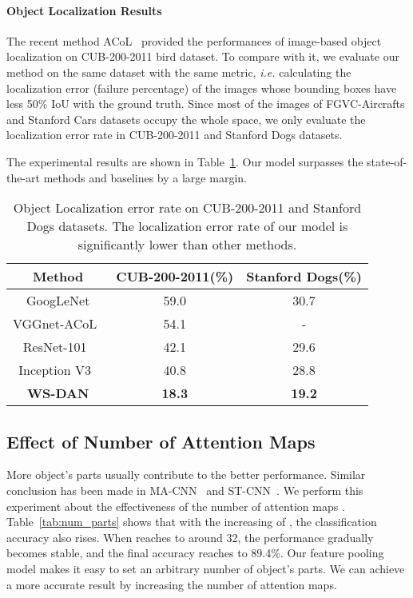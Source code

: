 \documentclass[10pt,twocolumn,letterpaper]{article}
\def\ie{{\em i.e. }}
\begin{document}
\paragraph{Object Localization Results}
 The recent method ACoL~\cite{acol} provided the performances of image-based object localization on CUB-200-2011 bird dataset. To compare with it, we evaluate our method on the same dataset with the same metric, \ie calculating the localization error (failure percentage) of the images whose bounding boxes have less 50\% IoU with the ground truth. Since most of the images of FGVC-Aircrafts and Stanford Cars datasets occupy the whole space, we only evaluate the localization error rate in CUB-200-2011 and Stanford Dogs datasets.

 The experimental results are shown in Table~\ref{tab:localiztion_error}. Our model surpasses the state-of-the-art methods and baselines by a large margin.



\begin{table}[h]
	\begin{center}
		\scriptsize
		\begin{tabular}{c|c|c}
			\hline
			Method & CUB-200-2011(\%) & Stanford Dogs(\%)\\
			\hline
			GoogLeNet  &  59.0 & 30.7 \\
      VGGnet-ACoL~\cite{acol} &  54.1 & - \\
      ResNet-101~\cite{resnet} & 42.1 & 29.6 \\
      Inception V3~\cite{densenet} & 40.8 & 28.8 \\
      \hline
			\textbf{WS-DAN} & \textbf{18.3} & \textbf{19.2}\\
			\hline
		\end{tabular}
	\end{center}
	\caption {Object Localization error rate on CUB-200-2011 and Stanford Dogs datasets. The localization error rate of our model is significantly lower than other methods.}
	\label{tab:localiztion_error}
\end{table}

\subsection{Effect of Number of Attention Maps}
More object's parts usually contribute to the better performance. Similar conclusion has been made in MA-CNN~\cite{ma-cnn} and ST-CNN~\cite{stn}. We perform this experiment about the effectiveness of the number of attention maps . Table~\ref{tab:num_parts} shows that with the increasing of , the classification accuracy also rises. When  reaches to around 32, the performance gradually becomes stable, and the final accuracy reaches to 89.4\%. Our feature pooling model makes it easy to set an arbitrary number of object's parts. We can achieve a more accurate result by increasing the number of attention maps.
\end{document}
